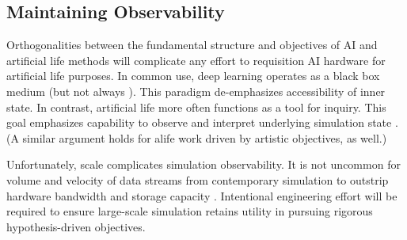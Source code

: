 
\subsection{Maintaining Observability}

Orthogonalities between the fundamental structure and objectives of AI and artificial life methods will complicate any effort to requisition AI hardware for artificial life purposes.
In common use, deep learning operates as a black box medium \citep{loyola2019black} (but not always \citep{mahendran2015understanding}).
This paradigm de-emphasizes accessibility of inner state.
In contrast, artificial life more often functions as a tool for inquiry.
This goal emphasizes capability to observe and interpret underlying simulation state \citep{moreno2023toward,horgan1995complexity}.
(A similar argument holds for alife work driven by artistic objectives, as well.)

Unfortunately, scale complicates simulation observability.
It is not uncommon for volume and velocity of data streams from contemporary simulation to outstrip hardware bandwidth and storage capacity \citep{osti_1770192}.
Intentional engineering effort will be required to ensure large-scale simulation retains utility in pursuing rigorous hypothesis-driven objectives.

